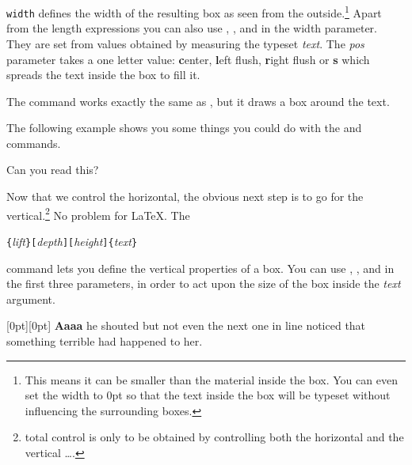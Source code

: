 \noindent \texttt{width} defines the width of the resulting box as
seen from the outside.\footnote{This means it can be smaller than the
  material inside the box. You can even set the
  width to 0pt so that the text inside the box will be typeset without
  influencing the surrounding boxes.}  Apart from the length
  expressions you can also use , ,  and
   in the width parameter. They are set from values
  obtained by measuring the typeset \emph{text}. The \emph{pos} parameter takes
a one letter value: \textbf{c}enter, \textbf{l}eft flush,
\textbf{r}ight flush or \textbf{s} which spreads the text inside the
box to fill it.

The command  works exactly the same as , but
it draws a box around the text.

The following example shows you some things you could do with
the  and  commands.

\begin{example}
\par
{}\par
{} \par
{} \par
{} 
Can you read this?
\end{example}

Now that we control the horizontal, the obvious next step is to go for
  the vertical.\footnote{total control is only to be obtained by
  controlling both the horizontal and the vertical \ldots.}
 No problem for \LaTeX{}. The


\begin{command}
\verb|{|\emph{lift}\verb|}[|\emph{depth}\verb|][|\emph{height}\verb|]{|\emph{text}\verb|}|
\end{command}

\noindent command lets you define the vertical properties of a
box. You can use , ,  and
   in the first three parameters, in order to act
  upon the size of the box inside the \emph{text} argument.


\begin{example}
\raisebox{0pt}[0pt][0pt]{\Large%
\textbf{Aaaa%
%
%
%
}}
he shouted but not even the next
one in line noticed that something
terrible had happened to her.
\end{example}

